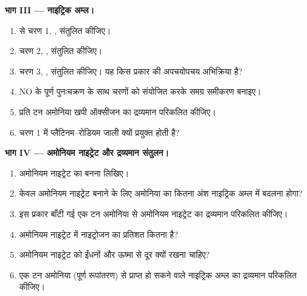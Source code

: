 \begin{problem}
\medskip
\noindent\textbf{भाग III --- नाइट्रिक अम्ल।}
\begin{enumerate}[resume]
  \item {} से चरण 1, , संतुलित कीजिए। %
  \item चरण 2, , संतुलित कीजिए। %
  \item चरण 3, , संतुलित कीजिए। यह किस प्रकार की अपचयोपचय %
        अभिक्रिया है?
  \item NO के पूर्ण पुनःचक्रण के साथ चरणों को संयोजित करके समग्र
        समीकरण बनाइए।
  \item प्रति टन अमोनिया खपी ऑक्सीजन का द्रव्यमान परिकलित कीजिए।
  \item चरण 1 में प्लैटिनम--रोडियम जाली क्यों प्रयुक्त होती है?
\end{enumerate}

\medskip
\noindent\textbf{भाग IV --- अमोनियम नाइट्रेट और द्रव्यमान संतुलन।}
\begin{enumerate}[resume]
  \item अमोनियम नाइट्रेट का बनना लिखिए।
  \item केवल अमोनियम नाइट्रेट बनाने के लिए अमोनिया का कितना अंश नाइट्रिक अम्ल में
        बदलना होगा?
  \item इस प्रकार बाँटी गई एक टन अमोनिया से अमोनियम नाइट्रेट का द्रव्यमान
        परिकलित कीजिए।
  \item अमोनियम नाइट्रेट में नाइट्रोजन का प्रतिशत कितना है?
  \item अमोनियम नाइट्रेट को ईंधनों और ऊष्मा से दूर क्यों रखना चाहिए?
  \item एक टन अमोनिया (पूर्ण रूपांतरण) से प्राप्त हो सकने वाले नाइट्रिक अम्ल का द्रव्यमान
        परिकलित कीजिए।
\end{enumerate}
\end{problem}
